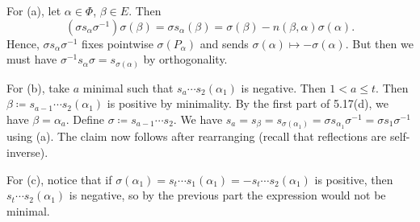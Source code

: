 For (a), let $\alpha \in \Phi$, $\beta \in E$. Then
\[ (\sigma s_\alpha \sigma^{-1})\sigma(\beta) = \sigma s_{\alpha}(\beta) = \sigma(\beta) - n(\beta, \alpha)\sigma(\alpha). \]
Hence, $\sigma s_\alpha \sigma^{-1}$ fixes pointwise $\sigma(P_\alpha)$ and
sends $\sigma(\alpha) \mapsto -\sigma(\alpha)$. But then we must have
$\sigma^{-1} s_\alpha\sigma = s_{\sigma(\alpha)}$ by orthogonality.

For (b), take $a$ minimal such that $s_a\cdots s_2(\alpha_1)$ is negative. Then
$1 < a\leq t$. Then $\beta\coloneqq s_{a-1}\cdots s_2(\alpha_1)$ is positive
by minimality. By the first part of 5.17(d), we have $\beta = \alpha_a$.
Define $\sigma\coloneqq s_{a-1}\cdots s_2$. We have
$s_a = s_{\beta} = s_{\sigma(\alpha_1)} = \sigma s_{\alpha_1}\sigma^{-1} = \sigma s_1\sigma^{-1}$ using
(a). The claim now follows after rearranging (recall that reflections
are self-inverse).

For (c), notice that if
$\sigma(\alpha_1) = s_t\cdots s_1(\alpha_1) = -s_t\cdots s_2(\alpha_1)$ is positive,
then $s_t\cdots s_2(\alpha_1)$ is negative, so by the previous part the
expression would not be minimal.
